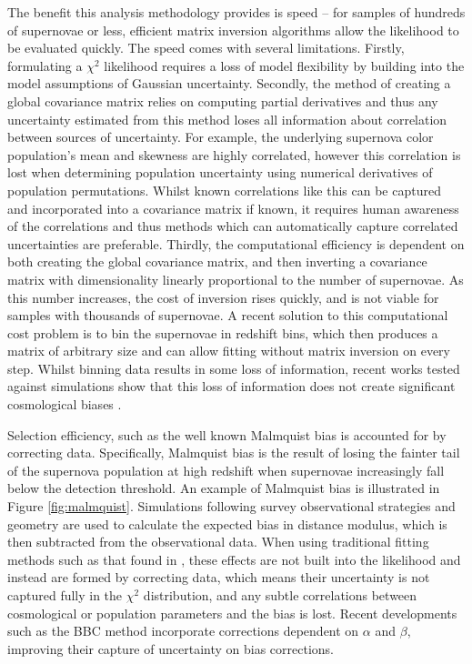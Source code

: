 \documentclass[a4paper,fleqn,usenatbib]{mnras}
\newcommand{\green}{\color{forestgreen}}
\begin{document}
The benefit this analysis methodology provides is speed -- for samples of hundreds of supernovae or less, efficient matrix inversion algorithms allow the likelihood to be evaluated quickly. The speed comes with several limitations. Firstly, formulating a $\chi^2$ likelihood requires a loss of model flexibility by building into the model assumptions of Gaussian uncertainty. Secondly, the method of creating a global covariance matrix relies on computing partial derivatives and thus any uncertainty estimated from this method loses all information about correlation between sources of uncertainty. For example, the underlying supernova color population's mean and skewness are highly correlated, however this correlation is lost when determining population uncertainty using numerical derivatives of population permutations. {\green Whilst known correlations like this can be captured and incorporated into a covariance matrix if known, it requires human awareness of the correlations and thus methods which can automatically capture correlated uncertainties are preferable.} Thirdly, the computational efficiency is dependent on both creating the global covariance matrix, and then inverting a covariance matrix with dimensionality linearly proportional to the number of supernovae. As this number increases, the cost of inversion rises quickly, and is not viable for samples with thousands of supernovae. A recent solution to this computational cost problem is to bin the supernovae {\green in redshift bins}, which then produces a matrix of arbitrary size {\green and can allow fitting without matrix inversion on every step}. Whilst binning data results in some loss of information, recent works tested against simulations show that this loss of information does not create significant cosmological biases \citep{Scolnic2016, Kessler2017}.

Selection efficiency, such as the well known Malmquist bias \citep{MalmquistK.G.1922} is accounted for by correcting data. Specifically, Malmquist bias is the result of losing the fainter tail of the supernova population at high redshift when supernovae increasingly fall below the detection threshold. An example of Malmquist bias is illustrated in Figure \ref{fig:malmquist}. Simulations following survey observational strategies and geometry are used to calculate the expected bias in distance modulus, which is then {\green subtracted from} the observational data. When using traditional fitting methods such as that found in \citet{Betoule2014}, these effects are not built into the likelihood and instead are formed by correcting data, which means their uncertainty is not captured fully in the $\chi^2$ distribution, and any subtle correlations between cosmological or population parameters and the bias is lost. {\green Recent developments such as the BBC method \citep{Kessler2017} incorporate corrections dependent on $\alpha$ and $\beta$, improving their capture of uncertainty on bias corrections.}
\end{document}
